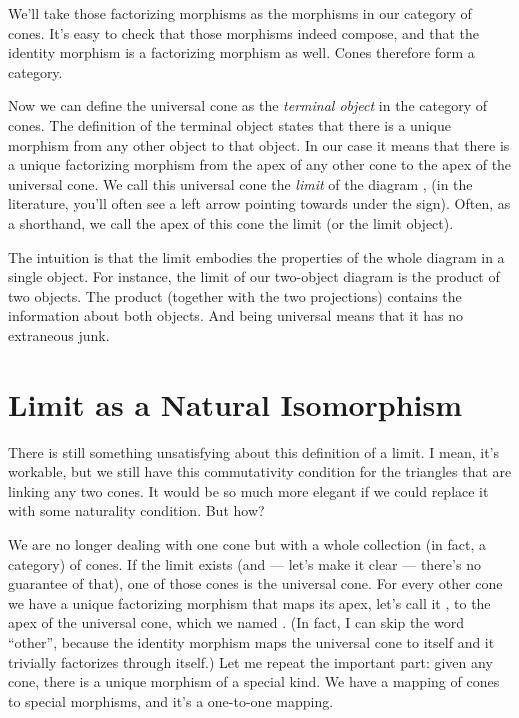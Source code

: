\noindent
We'll take those factorizing morphisms as the morphisms in our category
of cones. It's easy to check that those morphisms indeed compose, and
that the identity morphism is a factorizing morphism as well. Cones
therefore form a category.

Now we can define the universal cone as the \emph{terminal object} in
the category of cones. The definition of the terminal object states that
there is a unique morphism from any other object to that object. In our
case it means that there is a unique factorizing morphism from the apex
of any other cone to the apex of the universal cone. We call this
universal cone the \emph{limit} of the diagram ,  (in
the literature, you'll often see a left arrow pointing towards 
under the  sign). Often, as a shorthand, we call the apex of
this cone the limit (or the limit object).

The intuition is that the limit embodies the properties of the whole
diagram in a single object. For instance, the limit of our two-object
diagram is the product of two objects. The product (together with the
two projections) contains the information about both objects. And being
universal means that it has no extraneous junk.

\section{Limit as a Natural Isomorphism}\label{limit-as-a-natural-isomorphism}

There is still something unsatisfying about this definition of a limit.
I mean, it's workable, but we still have this commutativity condition
for the triangles that are linking any two cones. It would be so much
more elegant if we could replace it with some naturality condition. But
how?

We are no longer dealing with one cone but with a whole collection (in
fact, a category) of cones. If the limit exists (and --- let's make it
clear --- there's no guarantee of that), one of those cones is the
universal cone. For every other cone we have a unique factorizing
morphism that maps its apex, let's call it , to the apex of
the universal cone, which we named . (In fact, I can skip
the word ``other'', because the identity morphism maps the universal
cone to itself and it trivially factorizes through itself.) Let me
repeat the important part: given any cone, there is a unique morphism of
a special kind. We have a mapping of cones to special morphisms, and
it's a one-to-one mapping.

